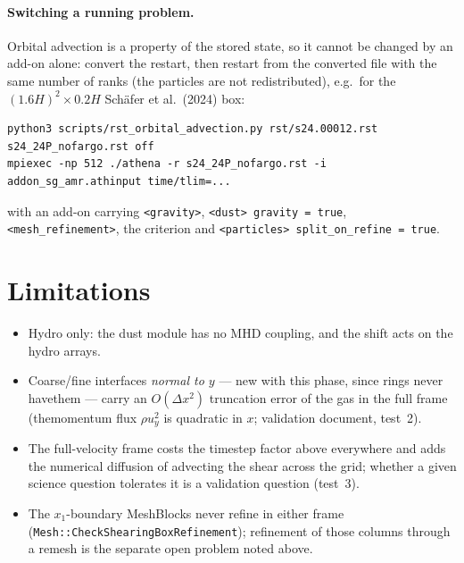 \documentclass[11pt]{article}
\newcommand{\code}[1]{\texttt{#1}}
\newcommand{\fn}[1]{\texttt{\small #1}}
\begin{document}
\paragraph{Switching a running problem.}  Orbital advection is a property of the stored
state, so it cannot be changed by an add-on alone: convert the restart, then restart from
the converted file with the same number of ranks (the particles are not
redistributed), e.g.\ for the $(1.6H)^2\times0.2H$ Sch\"afer et al.\ (2024) box:
\begin{lstlisting}
python3 scripts/rst_orbital_advection.py rst/s24.00012.rst s24_24P_nofargo.rst off
mpiexec -np 512 ./athena -r s24_24P_nofargo.rst -i addon_sg_amr.athinput time/tlim=...
\end{lstlisting}
with an add-on carrying \code{<gravity>}, \code{<dust> gravity = true},
\code{<mesh\_refinement>}, the criterion and \code{<particles> split\_on\_refine = true}.

\section{Limitations}

\begin{itemize}
\item Hydro only: the dust module has no MHD coupling, and the shift acts on the hydro
  arrays.
\item Coarse/fine interfaces \emph{normal to $y$} --- new with this phase, since rings never have\n  them --- carry an $O(\Delta x^2)$ truncation error of the gas in the full frame (the\n  momentum flux $\rho u_y^2$ is quadratic in $x$; validation document, test~2).\n\item The full-velocity frame costs the timestep factor above everywhere and adds the
  numerical diffusion of advecting the shear across the grid; whether a given science
  question tolerates it is a validation question (test~3).
\item The $x_1$-boundary MeshBlocks never refine in either frame
  (\fn{Mesh::CheckShearingBoxRefinement}); refinement of those columns through a remesh
  is the separate open problem noted above.
\end{itemize}
\end{document}
